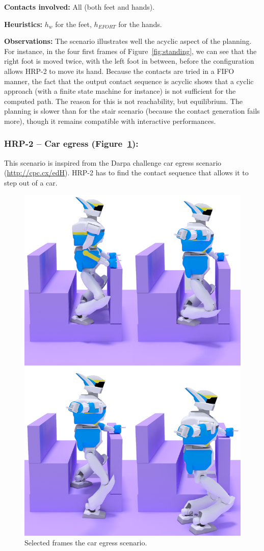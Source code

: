 \noindent\textbf{Contacts involved:} All (both feet and hands).

\noindent\textbf{Heuristics:} $h_w$ for the feet, $h_{EFORT}$  for the hands.

\noindent\textbf{Observations:} The scenario illustrates well the acyclic aspect of the planning. For instance, in the four first frames of Figure~\ref{fig:standing}, we can see that the right foot
is moved twice, with the left foot in between, before the configuration allows HRP-2 to move its hand.
Because the contacts are tried in a FIFO manner, the fact that the output contact sequence is acyclic shows that a cyclic approach (with a finite state machine for instance) is not sufficient
for the computed path. The reason for this is not reachability, but equilibrium. The planning is slower than for the stair scenario (because the contact generation fails more),
though it remains compatible with \gls{interactive} performances. %


\subsubsection{HRP-2 -- Car egress (Figure~\ref{fig:car}):}
This scenario is inspired from the Darpa challenge car egress scenario (\url{http://cpc.cx/edH}). HRP-2 has 
to find the contact sequence that allows it to step out of a car.

\begin{figure}
  \centering
  \includegraphics[width=0.5\linewidth]{figures/car}
  \caption{
           Selected frames the car egress scenario. }
		   \label{fig:car}
\end{figure}



